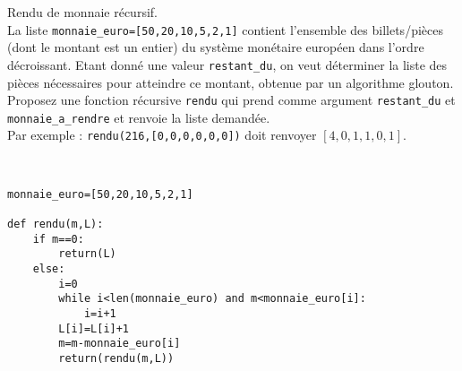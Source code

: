 \begin{exercice}Rendu de monnaie récursif.\\
La liste \verb?monnaie_euro=[50,20,10,5,2,1]? contient l'ensemble des billets/pièces (dont le montant est un entier) du système monétaire européen dans l'ordre décroissant. Etant donné une valeur \verb?restant_du?, on veut déterminer la liste des pièces nécessaires pour atteindre ce montant, obtenue par un algorithme glouton.\\
Proposez une fonction récursive \verb?rendu? qui prend comme argument \verb?restant_du? et \verb?monnaie_a_rendre? et renvoie la liste demandée.\\
Par exemple : \verb?rendu(216,[0,0,0,0,0,0])? doit renvoyer $[4,0,1,1,0,1]$.
\end{exercice}

\begin{solution}~\\
\vspace{-0.7cm}
\begin{verbatim}
monnaie_euro=[50,20,10,5,2,1]

def rendu(m,L):
    if m==0:
        return(L)
    else:
        i=0
        while i<len(monnaie_euro) and m<monnaie_euro[i]:
            i=i+1   
        L[i]=L[i]+1
        m=m-monnaie_euro[i]
        return(rendu(m,L))
\end{verbatim}
\end{solution}





















